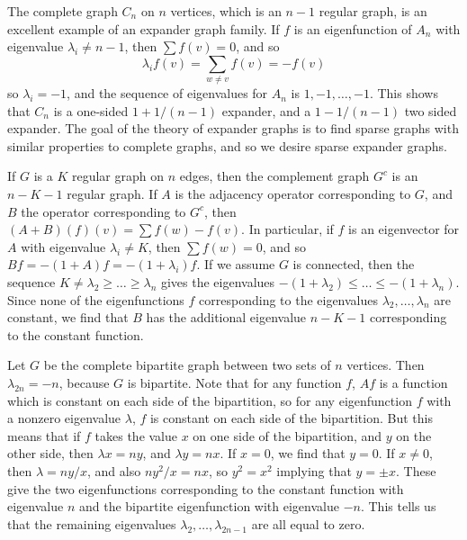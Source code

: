 \begin{example}
    The complete graph $C_n$ on $n$ vertices, which is an $n-1$ regular graph, is an excellent example of an expander graph family. If $f$ is an eigenfunction of $A_n$ with eigenvalue $\lambda_i \neq n-1$, then $\sum f(v) = 0$, and so
    \[ \lambda_i f(v) = \sum_{w \neq v} f(v) = -f(v) \]
    so $\lambda_i = -1$, and the sequence of eigenvalues for $A_n$ is $1,-1, \dots, -1$. This shows that $C_n$ is a one-sided $1 + 1/(n-1)$ expander, and a $1 - 1/(n-1)$ two sided expander. The goal of the theory of expander graphs is to find sparse graphs with similar properties to complete graphs, and so we desire sparse expander graphs.
\end{example}

\begin{example}
    If $G$ is a $K$ regular graph on $n$ edges, then the complement graph $G^c$ is an $n-K-1$ regular graph. If $A$ is the adjacency operator corresponding to $G$, and $B$ the operator corresponding to $G^c$, then $(A + B)(f)(v) = \sum f(w) - f(v)$. In particular, if $f$ is an eigenvector for $A$ with eigenvalue $\lambda_i \neq K$, then $\sum f(w) = 0$, and so $Bf = -(1+A)f = -(1 + \lambda_i)f$. If we assume $G$ is connected, then the sequence $K \neq \lambda_2 \geq \dots \geq \lambda_n$ gives the eigenvalues $-(1 + \lambda_2) \leq \dots \leq -(1 + \lambda_n)$. Since none of the eigenfunctions $f$ corresponding to the eigenvalues $\lambda_2, \dots, \lambda_n$ are constant, we find that $B$ has the additional eigenvalue $n-K-1$ corresponding to the constant function.
\end{example}

\begin{example}
    Let $G$ be the complete bipartite graph between two sets of $n$ vertices. Then $\lambda_{2n} = -n$, because $G$ is bipartite. Note that for any function $f$, $Af$ is a function which is constant on each side of the bipartition, so for any eigenfunction $f$ with a nonzero eigenvalue $\lambda$, $f$ is constant on each side of the bipartition. But this means that if $f$ takes the value $x$ on one side of the bipartition, and $y$ on the other side, then $\lambda x = n y$, and $\lambda y = n x$. If $x = 0$, we find that $y = 0$. If $x \neq 0$, then $\lambda = ny/x$, and also $ny^2/x = nx$, so $y^2 = x^2$ implying that $y = \pm x$. These give the two eigenfunctions corresponding to the constant function with eigenvalue $n$ and the bipartite eigenfunction with eigenvalue $-n$. This tells us that the remaining eigenvalues $\lambda_2, \dots, \lambda_{2n-1}$ are all equal to zero.
\end{example}

